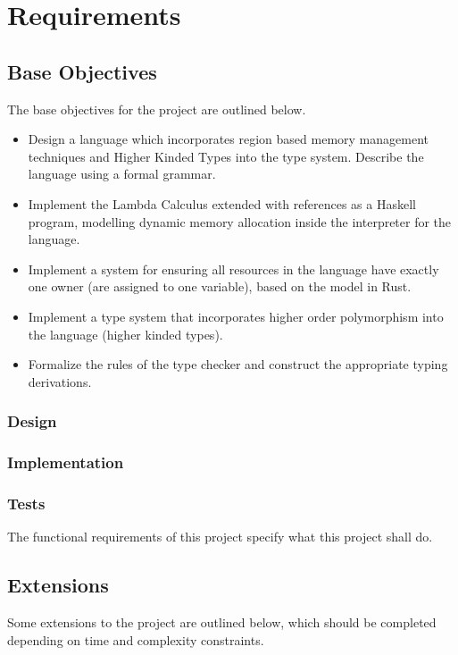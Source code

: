 \chapter{Requirements}\label{sec:requirements}

\section{Base Objectives}
The base objectives for the project are outlined below. 

\begin{itemize}
    \item
        Design a language which incorporates region based memory management
        techniques and Higher Kinded Types into the type system. Describe the 
        language using a formal grammar.
    \item
        Implement the Lambda Calculus extended with references as a Haskell
        program, modelling dynamic memory allocation inside the interpreter for
        the language.
    \item
        Implement a system for ensuring all resources in the language have
        exactly one owner (are assigned to one variable), based on the model in
        Rust.
    \item
        Implement a type system that incorporates higher order polymorphism
        into the language (higher kinded types).
    \item
        Formalize the rules of the type checker and construct the appropriate
        typing derivations.
\end{itemize}

\subsection{Design}

\subsection{Implementation}

\subsection{Tests}
The functional requirements of this project specify what this project shall do.

\section{Extensions}
Some extensions to the project are outlined below, which should be completed
depending on time and complexity constraints.

